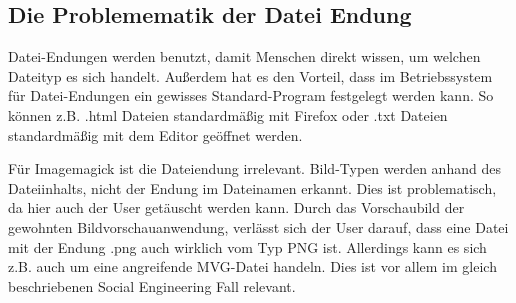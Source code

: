 \newpage
\subsection{Die Problemematik der Datei Endung}\label{subsec:die-problemematik-der-datei-endung}
Datei-Endungen werden benutzt, damit Menschen direkt wissen, um welchen Dateityp es sich handelt.
Außerdem hat es den Vorteil, dass im Betriebssystem für Datei-Endungen ein gewisses Standard-Program festgelegt werden kann.
So können z.B. .html Dateien standardmäßig mit Firefox oder .txt Dateien standardmäßig mit dem Editor geöffnet werden.

Für Imagemagick ist die Dateiendung irrelevant.
Bild-Typen werden anhand des Dateiinhalts, nicht der Endung im Dateinamen erkannt.
Dies ist problematisch, da hier auch der User getäuscht werden kann.
Durch das Vorschaubild der gewohnten Bildvorschauanwendung, verlässt sich der User darauf, dass eine Datei mit der Endung .png auch wirklich vom Typ PNG ist.
Allerdings kann es sich z.B. auch um eine angreifende MVG-Datei handeln.
Dies ist vor allem im gleich beschriebenen Social Engineering Fall relevant.